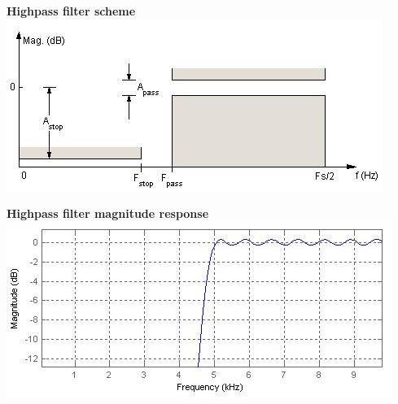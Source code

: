 \documentclass[a4paper,11pt]{article}
\begin{document}
\begin{minipage}[h]{0.47\linewidth}	
\begin{center} 
\textbf{Highpass filter scheme}\\
			\includegraphics[width=\linewidth]{./images/nonorth_alford/highpass_filter_scheme}
			
\end{center}
\end{minipage} \hfill
\begin{minipage}[h]{0.47\linewidth}
\begin{center}
\textbf{Highpass filter magnitude response}
			\includegraphics[width=\linewidth]{./images/nonorth_alford/highpass_margn_response}\\
	  		
\end{center}	  		
\end{minipage}

\vspace{\baselineskip}
\vspace{\baselineskip} 



%


%
\end{document}
